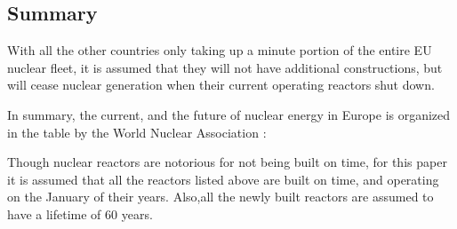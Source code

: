 \subsection{Summary}
With all the other countries only taking up a minute portion of the entire
EU nuclear fleet, it is assumed that they will not have additional constructions,
but will cease nuclear generation when their current operating reactors shut down.

In summary, the current, and the future of nuclear energy in Europe is organized
in the table by the World Nuclear Association \cite{world_nuclear_association_nuclear_2017}:

\begin{table}[h]
	\centering
	\caption {Power Reactors under construction and planned \cite{world_nuclear_association_nuclear_2017}}
\end{table}

Though nuclear reactors are notorious for not being built on time,
for this paper it is assumed that all the reactors listed above are built
on time, and operating on the January of their years. Also,all the newly
built reactors are assumed to have a lifetime of 60 years.
